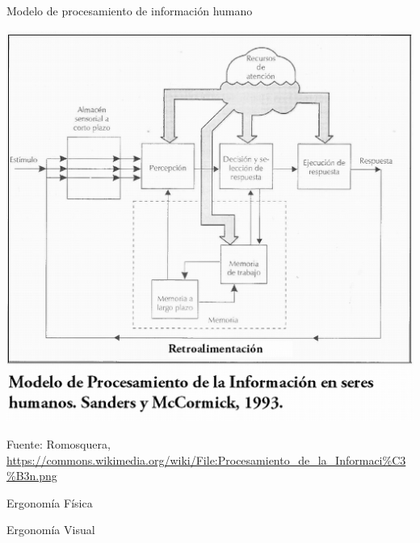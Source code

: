    
\begin{frame}{Modelo de procesamiento de informaci\'on humano}

  \includegraphics[width=0.6\linewidth]{imagenes/1.1.introduccion/modelo_procesamiento_informacion.png}

{\tiny Fuente: Romosquera, \url{https://commons.wikimedia.org/wiki/File:Procesamiento_de_la_Informaci\%C3\%B3n.png}
\\ \cite{mark1993human} }

\end{frame}

\begin{frame}{Ergonom\'ia F\'isica}
  
\end{frame}

\begin{frame}{Ergonom\'ia Visual}
  
\end{frame}




